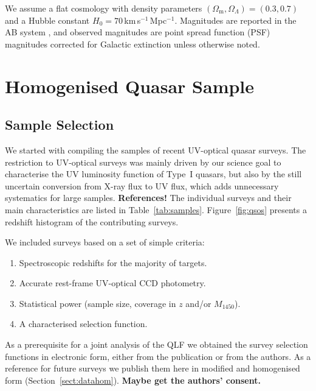 \documentclass[a4paper,fleqn,usenatbib]{mnras}
\begin{document}
We assume a flat cosmology with density parameters
$\left(\Omega_\mathrm{m},\Omega_\Lambda\right)=\left(0.3,0.7\right)$
and a Hubble constant $H_0=70$\,km\,s$^{-1}$\,Mpc$^{-1}$. Magnitudes
are reported in the AB system \citep{1983ApJ...266..713O}, and
observed magnitudes are point spread function (PSF) magnitudes
\citep{2002AJ....123..485S} corrected for Galactic extinction
\citep{1998ApJ...500..525S} unless otherwise noted.

\section{Homogenised Quasar Sample}

\subsection{Sample Selection}

We started with compiling the samples of recent UV-optical quasar
surveys. The restriction to UV-optical surveys was mainly driven by
our science goal to characterise the UV luminosity function of Type~I
quasars, but also by the still uncertain conversion from X-ray flux to
UV flux, which adds unnecessary systematics for large
samples. \textbf{References!} The individual surveys and their main
characteristics are listed in
Table~\ref{tab:samples}. Figure~\ref{fig:qsos} presents a redshift
histogram of the contributing surveys.

We included surveys based on a set of simple criteria:
\begin{enumerate}
\item Spectroscopic redshifts for the majority of targets.
\item Accurate rest-frame UV-optical CCD photometry.
\item Statistical power (sample size, coverage in $z$ and/or $M_{1450}$).
\item A characterised selection function.
\end{enumerate}
As a prerequisite for a joint analysis of the QLF we obtained the
survey selection functions in electronic form, either from the
publication or from the authors. As a reference for future surveys we
publish them here in modified and homogenised form
(Section~\ref{sect:datahom}). \textbf{Maybe get the authors' consent.}
\end{document}
